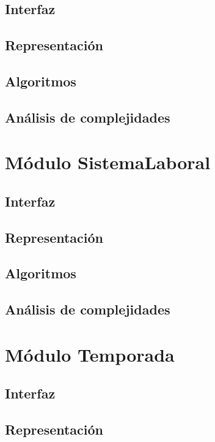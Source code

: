 \documentclass[12pt, a4paper]{article}
\begin{document}
\subsection{Interfaz}

\subsection{Representaci\'on}

\subsection{Algoritmos}

\subsection{Análisis de complejidades}

\newpage

\section{Módulo SistemaLaboral} 
\subsection{Interfaz}

\subsection{Representaci\'on}

\subsection{Algoritmos}

\subsection{Análisis de complejidades}

\newpage

\section{Módulo Temporada} 
\subsection{Interfaz}

\subsection{Representaci\'on}

\end{document}
